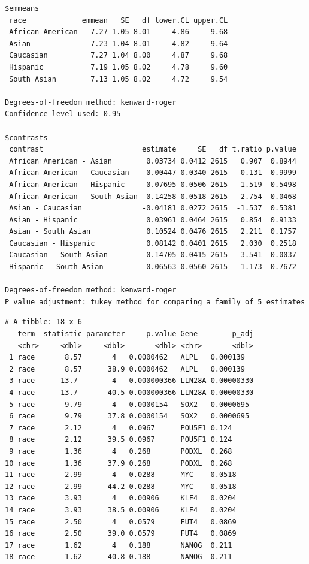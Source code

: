 \documentclass[
  letterpaper,
  DIV=11,
  numbers=noendperiod]{scrartcl}
\newenvironment{Shaded}{\begin{snugshade}}{\end{snugshade}}
\newcommand{\CommentTok}[1]{\textcolor[rgb]{0.37,0.37,0.37}{#1}}
\newcommand{\NormalTok}[1]{\textcolor[rgb]{0.00,0.23,0.31}{#1}}
\newcommand{\SpecialCharTok}[1]{\textcolor[rgb]{0.37,0.37,0.37}{#1}}
\begin{document}
\begin{verbatim}
$emmeans
 race             emmean   SE   df lower.CL upper.CL
 African American   7.27 1.05 8.01     4.86     9.68
 Asian              7.23 1.04 8.01     4.82     9.64
 Caucasian          7.27 1.04 8.00     4.87     9.68
 Hispanic           7.19 1.05 8.02     4.78     9.60
 South Asian        7.13 1.05 8.02     4.72     9.54

Degrees-of-freedom method: kenward-roger 
Confidence level used: 0.95 

$contrasts
 contrast                       estimate     SE   df t.ratio p.value
 African American - Asian        0.03734 0.0412 2615   0.907  0.8944
 African American - Caucasian   -0.00447 0.0340 2615  -0.131  0.9999
 African American - Hispanic     0.07695 0.0506 2615   1.519  0.5498
 African American - South Asian  0.14258 0.0518 2615   2.754  0.0468
 Asian - Caucasian              -0.04181 0.0272 2615  -1.537  0.5381
 Asian - Hispanic                0.03961 0.0464 2615   0.854  0.9133
 Asian - South Asian             0.10524 0.0476 2615   2.211  0.1757
 Caucasian - Hispanic            0.08142 0.0401 2615   2.030  0.2518
 Caucasian - South Asian         0.14705 0.0415 2615   3.541  0.0037
 Hispanic - South Asian          0.06563 0.0560 2615   1.173  0.7672

Degrees-of-freedom method: kenward-roger 
P value adjustment: tukey method for comparing a family of 5 estimates 
\end{verbatim}

\begin{Shaded}
\end{Shaded}

\begin{verbatim}
# A tibble: 18 x 6
   term  statistic parameter     p.value Gene        p_adj
   <chr>     <dbl>     <dbl>       <dbl> <chr>       <dbl>
 1 race       8.57       4   0.0000462   ALPL   0.000139  
 2 race       8.57      38.9 0.0000462   ALPL   0.000139  
 3 race      13.7        4   0.000000366 LIN28A 0.00000330
 4 race      13.7       40.5 0.000000366 LIN28A 0.00000330
 5 race       9.79       4   0.0000154   SOX2   0.0000695 
 6 race       9.79      37.8 0.0000154   SOX2   0.0000695 
 7 race       2.12       4   0.0967      POU5F1 0.124     
 8 race       2.12      39.5 0.0967      POU5F1 0.124     
 9 race       1.36       4   0.268       PODXL  0.268     
10 race       1.36      37.9 0.268       PODXL  0.268     
11 race       2.99       4   0.0288      MYC    0.0518    
12 race       2.99      44.2 0.0288      MYC    0.0518    
13 race       3.93       4   0.00906     KLF4   0.0204    
14 race       3.93      38.5 0.00906     KLF4   0.0204    
15 race       2.50       4   0.0579      FUT4   0.0869    
16 race       2.50      39.0 0.0579      FUT4   0.0869    
17 race       1.62       4   0.188       NANOG  0.211     
18 race       1.62      40.8 0.188       NANOG  0.211     
\end{verbatim}
\end{document}
